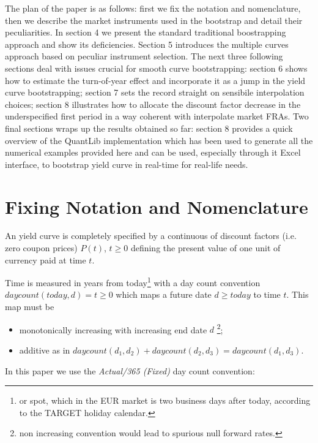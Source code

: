 \documentclass[11pt,reqno]{amsart}
\begin{document}
The plan of the paper is as follows: first we fix the notation and
nomenclature, then we describe the market instruments used in the bootstrap
and detail their peculiarities. In section 4 we present the standard
traditional boostrapping approach and show its deficiencies. Section 5
introduces the multiple curves approach based on peculiar instrument
selection. The next three following sections deal with issues crucial for
smooth curve bootstrapping:
section 6 shows how to estimate the turn-of-year
effect and incorporate it as a jump in the yield curve bootstrapping;
section 7 sets the record straight on sensibile
interpolation choices; 
section 8 illustrates how to allocate the discount factor decrease in the
underspecified first period in a way coherent with interpolate market FRAs.
Two final sections wraps up the results obtained so far: section 8 provides
a quick overview of the QuantLib implementation which has been used to
generate all the numerical examples provided here and can be used,
especially through it Excel interface, to bootstrap yield curve in real-time
for real-life needs.

\section{Fixing Notation and Nomenclature}

An yield curve is completely specified by a continuous of discount factors
(i.e. zero coupon prices) $P(t) $, $t\geq 0$ defining the
present value of one unit of currency paid at time $t$.

Time is measured in years from today\footnote{%
or spot, which in the EUR market is two business days after today, according
to the TARGET holiday calendar.} with a day count convention $daycount\left(
today,d\right) =t\geq 0$ which maps a future date $d\geq today$ to time $t$.
This map must be

\begin{itemize}
\item monotonically increasing with increasing end date $d$ \footnote{%
non increasing convention would lead to spurious null forward rates.};

\item additive as in $daycount\left( d_{1},d_{2}\right) +daycount\left(
d_{2},d_{3}\right) =daycount\left( d_{1},d_{3}\right) $.
\end{itemize}

In this paper we use the \textit{Actual/365 (Fixed)} \cite{ISDA} day count
convention:
\end{document}
